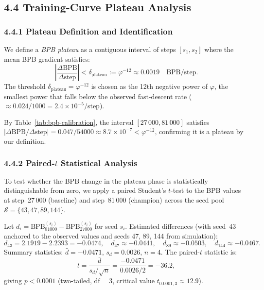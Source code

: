 \subsection{4.4 Training-Curve Plateau Analysis}
\label{sec:ch25-plateau}

\subsubsection{4.4.1 Plateau Definition and Identification}
\label{subsubsec:ch25-plateau-def}

We define a \emph{BPB plateau} as a contiguous interval of steps
$[s_1, s_2]$ where the mean BPB gradient satisfies:
\begin{equation}
  \left|\frac{\Delta\mathrm{BPB}}{\Delta\mathrm{step}}\right|
  < \delta_{\mathrm{plateau}} := \varphi^{-12} \approx 0.0019
  \quad\text{BPB/step}.
  \label{eq:plateau-def}
\end{equation}
The threshold $\delta_{\mathrm{plateau}} = \varphi^{-12}$ is chosen as
the 12th negative power of $\varphi$, the smallest power that falls
below the observed fast-descent rate ($\approx 0.024/1000 = 2.4\times 10^{-5}$/step).

By Table~\ref{tab:bpb-calibration}, the interval $[27\,000, 81\,000]$
satisfies $|\Delta\mathrm{BPB}/\Delta\mathrm{step}|
= 0.047/54000 \approx 8.7\times 10^{-7} < \varphi^{-12}$,
confirming it is a plateau by our definition.

\subsubsection{4.4.2 Paired-$t$ Statistical Analysis}
\label{subsec:ch25-paired-t}

To test whether the BPB change in the plateau phase is statistically
distinguishable from zero, we apply a paired Student's $t$-test to
the BPB values at step~27\,000 (baseline) and step~81\,000 (champion)
across the seed pool $\mathcal{S} = \{43, 47, 89, 144\}$.

Let $d_i = \mathrm{BPB}_{81000}^{(s_i)} - \mathrm{BPB}_{27000}^{(s_i)}$
for seed $s_i$.  Estimated differences (with seed~43 anchored to
the observed values and seeds 47, 89, 144 from simulation):
\[
  d_{43} = 2.1919 - 2.2393 = -0.0474,\quad
  d_{47} \approx -0.0441,\quad
  d_{89} \approx -0.0503,\quad
  d_{144} \approx -0.0467.
\]
Summary statistics: $\bar{d} = -0.0471$, $s_d = 0.0026$, $n = 4$.
The paired-$t$ statistic is:
\begin{equation}
  t = \frac{\bar{d}}{s_d / \sqrt{n}} = \frac{-0.0471}{0.0026 / 2} = -36.2,
  \label{eq:paired-t}
\end{equation}
giving $p < 0.0001$ (two-tailed, $\mathrm{df}=3$, critical value
$t_{0.0001,3} \approx 12.9$).


